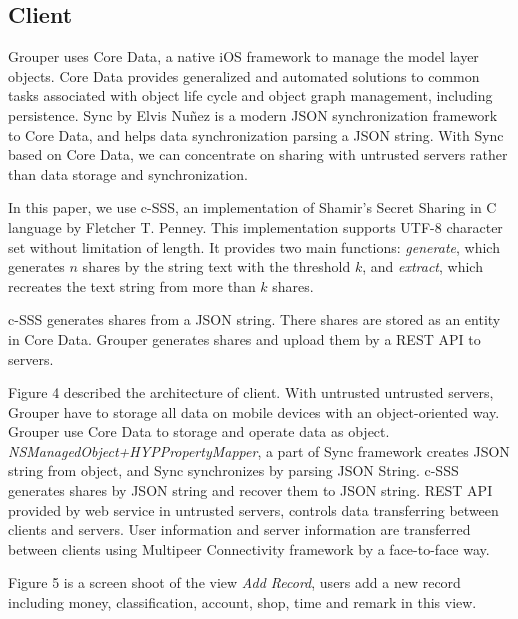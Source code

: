 \documentclass[twocolumn,10pt]{article}
\begin{document}
\subsection{Client}
 Grouper uses Core Data\cite{coredata}, a native iOS framework to manage the model layer objects. Core Data provides generalized and automated solutions to common tasks associated with object life cycle and object graph management, including persistence. Sync\cite{sync} by Elvis Nu\~{n}ez is a modern JSON synchronization framework to Core Data, and helps data synchronization parsing a JSON string. With Sync based on Core Data, we can concentrate on sharing with untrusted servers rather than data storage and synchronization.

In this paper, we use c-SSS\cite{c-sss}, an implementation of Shamir's Secret Sharing in C language by Fletcher T. Penney. This implementation supports UTF-8 character set without limitation of length. It provides two main functions: \emph{generate}, which generates $n$ shares by the string text with the threshold $k$, and \emph{extract}, which recreates the text string from more than $k$ shares. 

c-SSS generates shares from a JSON string. There shares are stored as an entity in Core Data. Grouper generates shares and upload them by a REST API to servers.

Figure 4 described the architecture of client. With untrusted untrusted servers, Grouper have to storage all data on mobile devices with an object-oriented way. Grouper use Core Data to storage and operate data as object. \emph{NSManagedObject+HYPPropertyMapper}, a part of Sync framework creates JSON string from object, and Sync synchronizes by parsing JSON String. c-SSS generates shares by JSON string and recover them to JSON string. REST API provided by web service in untrusted servers, controls data transferring between clients and servers. User information and server information are transferred between clients using Multipeer Connectivity framework by a face-to-face way.

Figure 5 is a screen shoot of the view \emph{Add Record}, users add a new record including money, classification, account, shop, time and remark in this view.
\end{document}
